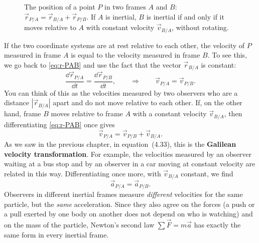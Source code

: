 \documentclass[11pt,a4paper]{article}
\begin{document}
\begin{figure}[ht]
\centering
{}
\caption{The position of a point $P$ in two frames $A$ and $B$: $\vec{r}_{P/A} = \vec{r}_{B/A} +
\vec{r}_{P/B}$. If $A$ is inertial, $B$ is inertial if and only if it moves relative to $A$ with
constant velocity $\vec{v}_{B/A}$, without rotating.}\label{fig:frames}
\end{figure}

If the two coordinate systems are at rest relative to each other, the velocity of $P$ measured in
frame $A$ is equal to the velocity measured in frame $B$. To see this, we go back to
\eqref{eq:r-PAB} and use the fact that the vector $\vec{r}_{B/A}$ is constant:
\begin{equation}\label{eq:same-v}
  \frac{\dd\vec{r}_{P/A}}{\dd t} = \frac{\dd\vec{r}_{P/B}}{\dd t} , \qquad \Rightarrow \qquad
  \vec{v}_{P/A} = \vec{v}_{P/B} .
\end{equation}
You can think of this as the velocities measured by two observers who are a distance
$|\vec{r}_{B/A}|$ apart and do not move relative to each other. If, on the other hand, frame $B$
moves relative to frame $A$ with a constant velocity $\vec{v}_{B/A}$, then differentiating
\eqref{eq:r-PAB} once gives
\begin{equation}\label{eq:galileo-v}
  \vec{v}_{P/A} = \vec{v}_{P/B} + \vec{v}_{B/A} .
\end{equation}
As we saw in the previous chapter, in equation~(4.33), this is the \textbf{Galilean velocity
transformation}. For example, the velocities measured by an observer waiting at a bus stop and by
an observer in a car moving at constant velocity are related in this way. Differentiating once
more, with
$\vec{v}_{B/A}$ constant, we find
\[
  \vec{a}_{P/A} = \vec{a}_{P/B} .
\]
Observers in different inertial frames measure \emph{different} velocities for the same particle,
but the \emph{same} acceleration. Since they also agree on the forces (a push or a pull exerted by
one body on another does not depend on who is watching) and on the mass of the particle, Newton's
second law $\sum\vec{F} = m\vec{a}$ has exactly the same form in every inertial frame.
\end{document}
